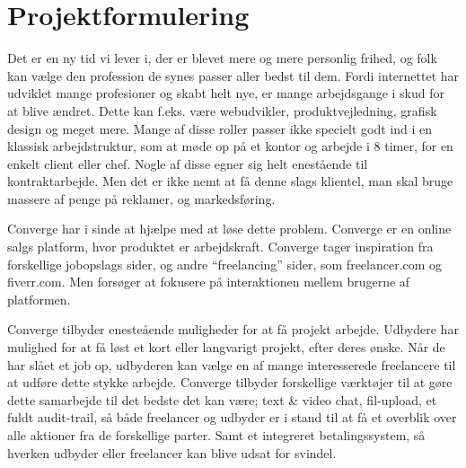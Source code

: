 \chapter{Projektformulering} %
\label{cha:Projektformulering}

Det er en ny tid vi lever i, der er blevet mere og mere personlig frihed, og folk kan vælge den profession de synes passer aller bedst til dem. Fordi internettet har udviklet mange profesioner og skabt helt nye, er mange arbejdsgange i skud for at blive ændret. Dette kan f.eks. være webudvikler, produktvejledning, grafisk design og meget mere. Mange af disse roller passer ikke specielt godt ind i en klassisk arbejdstruktur, som at møde op på et kontor og arbejde i 8 timer, for en enkelt client eller chef. Nogle af disse egner sig helt enestående til kontraktarbejde. Men det er ikke nemt at få denne slags klientel, man skal bruge massere af penge på reklamer, og markedsføring.

Converge har i sinde at hjælpe med at løse dette problem. Converge er en online salgs platform, hvor produktet er arbejdskraft. Converge tager inspiration fra forskellige jobopslags sider, og andre ``freelancing'' sider, som freelancer.com og fiverr.com. Men forsøger at fokusere på interaktionen mellem brugerne af platformen.

Converge tilbyder enesteående muligheder for at få projekt arbejde. Udbydere har mulighed for at få løst et kort eller langvarigt projekt, efter deres ønske. Når de har slået et job op, udbyderen kan vælge en af mange interesserede freelancere til at udføre dette stykke arbejde. Converge tilbyder forskellige værktøjer til at gøre dette samarbejde til det bedste det kan være; text \& video chat, fil-upload, et fuldt audit-trail, så både freelancer og udbyder er i stand til at få et overblik over alle aktioner fra de forskellige parter. Samt et integreret betalingssystem, så hverken udbyder eller freelancer kan blive udsat for svindel.

